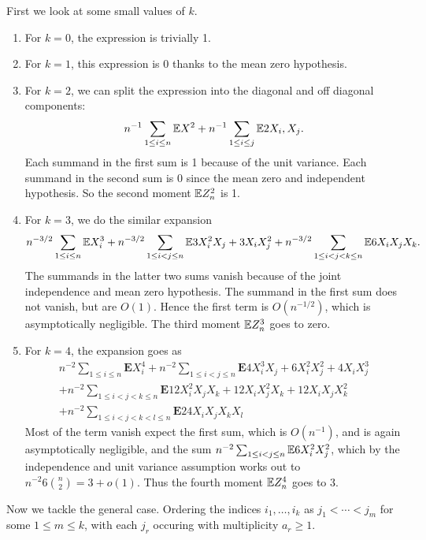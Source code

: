 First we look at some small values of $k$.
\begin{enumerate}
    \item For $k=0$, the expression is trivially 1.
    \item For $k=1$, this expression is 0 thanks to the mean zero hypothesis.
    \item For $k=2$, we can split the expression into the diagonal and off diagonal components:\begin{equation*}
        n^{-1}\sum_{1\leq i\leq n} \mathbb{E} X^2 +n^{-1}\sum_{1\leq i\leq j}\mathbb{E} 2X_i,X_j.
    \end{equation*}
    Each summand in the first sum is 1 because of the unit variance. Each summand in the second sum is 0 since the mean zero and independent hypothesis. So the second moment $\mathbb{E} Z_n^2$ is 1.
    \item For $k=3$, we do the similar expansion
    \begin{equation*}
        n^{-3/2} \sum_{1\leq i\leq n}\mathbb{E} X^3_i +n^{-3/2}\sum_{1\leq i<j\leq n} \mathbb{E} 3X_i^2 X_j +3X_i X_j^2 +n^{-3/2} \sum_{1\leq i<j<k\leq n}\mathbb{E} 6X_iX_jX_k.
    \end{equation*}
    The summands in the latter two sums vanish because of the joint independence and mean zero hypothesis. The summand in the first sum does not vanish, but are $O(1)$. Hence the first term is $O(n^{-1/2})$, which is asymptotically negligible. The third moment $\mathbb{E} Z_n^3$ goes to zero.
    \item For $k=4$, the expansion goes as 
    \begin{equation*}
        \begin{array}{l}
            n^{-2} \sum_{1 \leq i \leq n} \mathbf{E} X_{i}^{4}+n^{-2} \sum_{1 \leq i<j \leq n} \mathbf{E} 4 X_{i}^{3} X_{j}+6 X_{i}^{2} X_{j}^{2}+4 X_{i} X_{j}^{3} \\
            +n^{-2} \sum_{1 \leq i<j<k \leq n} \mathbf{E} 12 X_{i}^{2} X_{j} X_{k}+12 X_{i} X_{j}^{2} X_{k}+12 X_{i} X_{j} X_{k}^{2} \\
            +n^{-2} \sum_{1 \leq i<j<k<l \leq n} \mathbf{E} 24 X_{i} X_{j} X_{k} X_{l}
            \end{array}
    \end{equation*}
    Most of the term vanish expect the first sum, which is $O(n^{-1})$, and is again asymptotically negligible, and the sum $n^{-2}\sum_{1\leq i<j\leq n}\mathbb{E} 6X_i^2X_j^2$, which by the independence and unit variance assumption works out to $n^{-2}6\binom{n}{2}=3+o(1)$. Thus the fourth moment $\mathbb{E} Z_n^4$ goes to 3. 
\end{enumerate}
Now we tackle the general case. Ordering the indices $i_1,\dots,i_k$ as $j_1<\cdots<j_m$ for some $1\leq m\leq k$, with each $j_r$ occuring with multiplicity $a_r\geq 1$. 

